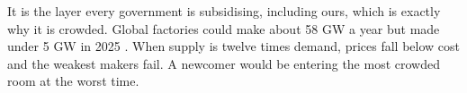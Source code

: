 \begin{plainwords}
It is the layer every government is subsidising, including ours, which is exactly why it is crowded. Global factories could make about 58 GW a year but made under 5 GW in 2025 \cite{argus2026}. When supply is twelve times demand, prices fall below cost and the weakest makers fail. A newcomer would be entering the most crowded room at the worst time.
\end{plainwords}
